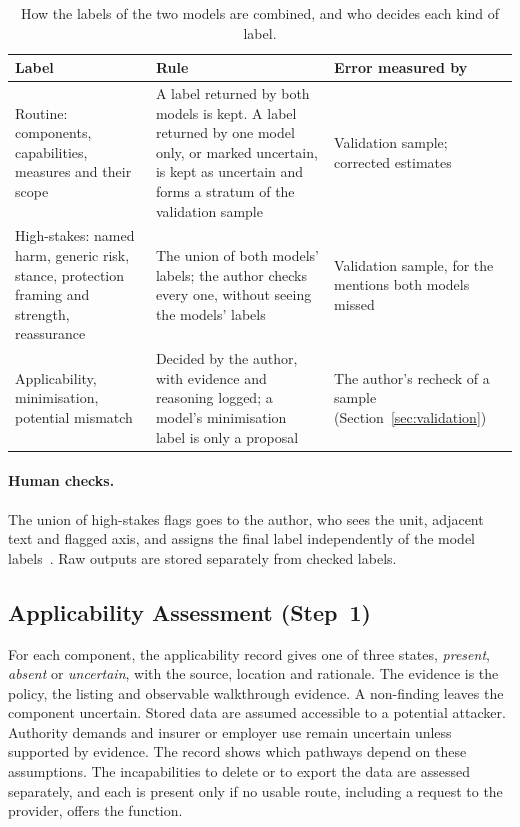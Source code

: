 \begin{table}[H]
\centering
\begin{singlespace}
\caption[How the labels of the two models are combined]{How the labels of the two models
are combined, and who decides each kind of label.}
\label{tab:llm-routing}
\footnotesize
\begin{tabularx}{\textwidth}{@{}>{\raggedright\arraybackslash}p{3.3cm}>{\raggedright\arraybackslash}X>{\raggedright\arraybackslash}p{3.6cm}@{}}
\toprule
\textbf{Label} & \textbf{Rule} & \textbf{Error measured by} \\
\midrule
Routine: components, capabilities, measures and their scope
  & A label returned by both models is kept. A label returned by one model only, or marked uncertain, is kept as uncertain and forms a stratum of the validation sample
  & Validation sample; corrected estimates \\
\cmidrule[0.3pt]{2-3}
High-stakes: named harm, generic risk, stance, protection framing and strength, reassurance
  & The union of both models' labels; the author checks every one, without seeing the models' labels
  & Validation sample, for the mentions both models missed \\
\cmidrule[0.3pt]{2-3}
Applicability, minimisation, potential mismatch
  & Decided by the author, with evidence and reasoning logged; a model's minimisation label is only a proposal
  & The author's recheck of a sample (Section~\ref{sec:validation}) \\
\bottomrule
\end{tabularx}
\end{singlespace}
\end{table}

\paragraph{Human checks.} The union of high-stakes flags
goes to the author, who sees the unit, adjacent text and flagged axis, and assigns the
final label independently of the model labels~\parencite{schroeder2025just}. Raw outputs are stored separately from
checked labels.

\subsection{Applicability Assessment (Step~1)}
\label{sec:apply}
For each component, the applicability record gives one of three states, \emph{present},
\emph{absent} or \emph{uncertain}, with the source, location and rationale. The evidence is the
policy, the listing and observable walkthrough evidence. A non-finding leaves the component
uncertain. Stored data are assumed accessible to a potential attacker. Authority demands and
insurer or employer use remain uncertain unless supported by evidence. The record shows which
pathways depend on these assumptions. The incapabilities to delete or to export the data are
assessed separately, and each is present only if no usable route, including a request to the
provider, offers the function.

